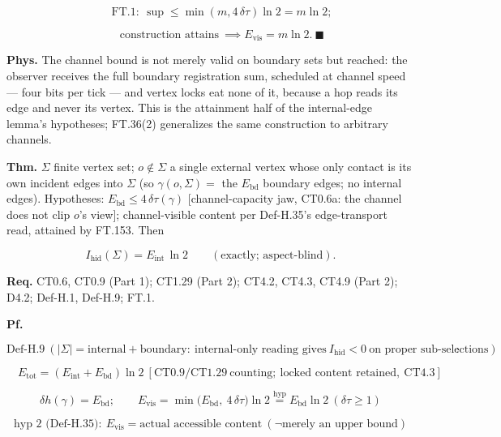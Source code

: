 \begin{theorem}
\[
\qquad \mathrm{FT.1}:\ \sup\le\min(m,4\,\delta\tau)\ln2=m\ln2;
\]

\[
\qquad \text{construction attains}\ \implies E_{\mathrm{vis}}=m\ln2.\ \blacksquare
\]

\textbf{Phys.} The channel bound is not merely valid on boundary sets but reached: the observer receives the full boundary registration sum, scheduled at channel speed — four bits per tick — and vertex locks eat none of it, because a hop reads its edge and never its vertex. This is the attainment half of the internal-edge lemma's hypotheses; FT.36(2) generalizes the same construction to arbitrary channels.

\end{theorem}

\begin{theorem}\label{tag:FT-17}
\textbf{Thm.} $\Sigma$ finite vertex set; $o\notin\Sigma$ a single external vertex whose only contact is its own incident edges into $\Sigma$ (so $\gamma(o,\Sigma)=$ the $E_{\mathrm{bd}}$ boundary edges; no internal edges). Hypotheses: $E_{\mathrm{bd}}\le4\,\delta\tau(\gamma)$ [channel-capacity jaw, CT0.6a: the channel does not clip $o$'s view]; channel-visible content per Def-H.35's edge-transport read, attained by FT.153. Then

\[
I_{\mathrm{hid}}(\Sigma)=E_{\mathrm{int}}\,\ln2\qquad(\text{exactly; aspect-blind}).
\]

\textbf{Req.} CT0.6, CT0.9 (Part 1); CT1.29 (Part 2); CT4.2, CT4.3, CT4.9 (Part 2); D4.2; Def-H.1, Def-H.9; FT.1.

\textbf{Pf.}

\[
\mathrm{Def\text{-}H.9}\ (|\Sigma|=\text{internal}+\text{boundary}:\ \text{internal-only reading gives}\ I_{\mathrm{hid}}<0\ \text{on proper sub-selections}):
\]

\[
\quad E_{\mathrm{tot}}=(E_{\mathrm{int}}+E_{\mathrm{bd}})\ln2\ [\mathrm{CT0.9}/\mathrm{CT1.29}\ \text{counting};\ \text{locked content retained},\ \mathrm{CT4.3}]
\]

\[
\delta h(\gamma)=E_{\mathrm{bd}};\qquad E_{\mathrm{vis}}=\min\bigl(E_{\mathrm{bd}},\ 4\,\delta\tau\bigr)\ln2\overset{\text{hyp}}{=}E_{\mathrm{bd}}\ln2\ (\delta\tau\ge1)
\]

\[
\text{hyp 2 (Def-H.35)}:\ E_{\mathrm{vis}}=\text{actual accessible content}\ (\neg\text{merely an upper bound})
\]


\end{theorem}
